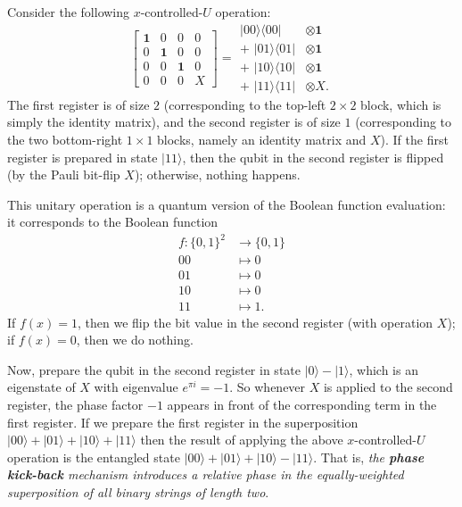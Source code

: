 \documentclass[fleqn]{article}
\begin{document}
Consider the following \(x\)-controlled-\(U\) operation:
\[
  \left[
    \begin{array}{cccc}
      \mathbf{1}& 0 & 0 & 0
    \\0 & \mathbf{1}& 0 & 0
    \\0 & 0 & \mathbf{1}& 0
    \\0 & 0 & 0 & X
    \end{array}
  \right]
  = \begin{aligned}
    |00\rangle\langle 00|&\otimes\mathbf{1}
  \\+\,\,|01\rangle\langle 01|&\otimes\mathbf{1}
  \\+\,\,|10\rangle\langle 10|&\otimes\mathbf{1}
  \\+\,\,|11\rangle\langle 11|&\otimes X.
  \end{aligned}
\]
The first register is of size \(2\) (corresponding to the top-left \(2\times 2\) block, which is simply the identity matrix), and the second register is of size \(1\) (corresponding to the two bottom-right \(1\times1\) blocks, namely an identity matrix and \(X\)).
If the first register is prepared in state \(|11\rangle\), then the qubit in the second register is flipped (by the Pauli bit-flip \(X\)); otherwise, nothing happens.

This unitary operation is a quantum version of the Boolean function evaluation: it corresponds to the Boolean function
\[
  \begin{aligned}
    f\colon\{0,1\}^2 &\longrightarrow \{0,1\}
  \\00&\longmapsto0
  \\01&\longmapsto0
  \\10&\longmapsto0
  \\11&\longmapsto1.
  \end{aligned}
\]
If \(f(x)=1\), then we flip the bit value in the second register (with operation \(X\)); if \(f(x)=0\), then we do nothing.

Now, prepare the qubit in the second register in state \(|0\rangle-|1\rangle\), which is an eigenstate of \(X\) with eigenvalue \(e^{\pi i}=-1\).
So whenever \(X\) is applied to the second register, the phase factor \(-1\) appears in front of the corresponding term in the first register.
If we prepare the first register in the superposition \(|00\rangle+|01\rangle+|10\rangle+|11\rangle\) then the result of applying the above \(x\)-controlled-\(U\) operation is the entangled state \(|00\rangle+|01\rangle+|10\rangle-|11\rangle\).
That is, \emph{the \textbf{phase kick-back} mechanism introduces a relative phase in the equally-weighted superposition of all binary strings of length two}.
\end{document}
